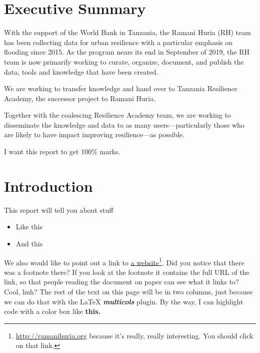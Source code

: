 \documentclass[a4paper,12pt,twoside]{article}
\begin{document}
\section{Executive Summary}
\label{executivesummary}
\begin{multicols}{2}

  \begin{mdframed}[hidealllines=true,backgroundcolor=RHgreen!10,innerleftmargin=6pt,innerrightmargin=6pt,leftmargin=-3pt,rightmargin=-3pt]

\color{RHgrey}
    
With the support of the World Bank in Tanzania, the Ramani Huria (RH) team has been collecting data for urban resilience with a particular emphasis on flooding since 2015. As the program nears its end in September of 2019, the RH team is now primarily working to curate, organize, document, and publish the data, tools and knowledge that have been created. 

We are working to transfer knowledge and hand over to Tanzania Resilience Academy, the successor project to Ramani Huria. 
\end{mdframed}

Together with the coalescing Resilience Academy team, we are working to disseminate the knowledge and data to as many users---particularly those who are likely to have impact improving resilience---as possible. 

I want this report to get 100\% marks.

\lipsum[10-18]

\end{multicols}


\newpage
\section{Introduction}
\label{Introduction}

This report will tell you about stuff

\begin{itemize}
  \item Like this
  \item And this
\end{itemize}

We also would like to point out a link to  \href{https://ramanihuria.org}{a website}\footnote{\url{http://ramanihuria.org}\color{RHgrey} { }because it's really, really interesting. You should click on that link.}. Did you notice that there was a footnote there? If you look at the footnote it contains the full URL of the link, so that people reading the document on paper can see what it links to? Cool, huh? The rest of the text on this page will be in two columns, just because we can do that with the \LaTeX{} \textbf{\textit{multicols}} plugin. By the way, I can highlight code with a color box like \textbf{\colorbox{code}{this.}}
\end{document}
